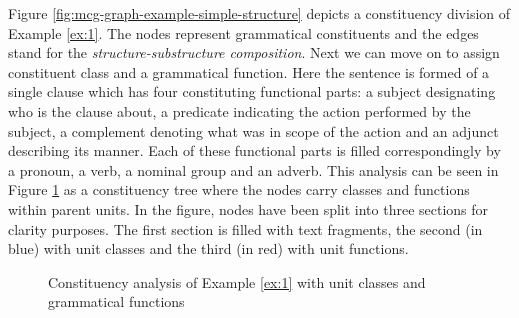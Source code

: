 Figure \ref{fig:mcg-graph-example-simple-structure} depicts a constituency division of Example \ref{ex:1}.%
The nodes represent grammatical constituents and the edges stand for the \textit{structure-substructure composition}. 
Next we can move on to assign constituent class and a grammatical function. 
Here the sentence is formed of a single clause which has four constituting functional parts: a subject designating who is the clause about, a predicate indicating the action performed by the subject, a complement denoting what was in scope of the action and an adjunct describing its manner. Each of these functional parts is filled correspondingly by a pronoun, a verb, a nominal group and an adverb. This analysis can be seen in Figure \ref{fig:constit-classes-example} as a constituency tree where the nodes carry classes and functions within parent units. In the figure, nodes have been split into three sections for clarity purposes. The first section is filled with text fragments, the second (in blue) with unit classes and the third (in red) with unit functions. 

\begin{figure}[!ht]
    \centering
    \caption{Constituency analysis of Example \ref{ex:1} with unit classes and grammatical functions}
    \label{fig:constit-classes-example}
\end{figure}

